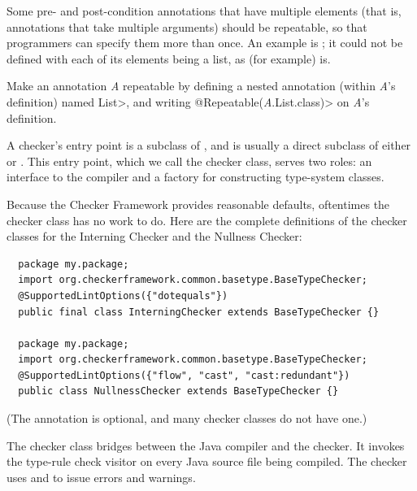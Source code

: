 
Some pre- and post-condition annotations that have multiple elements (that
is, annotations that take multiple arguments) should be repeatable, so that
programmers can specify them more than once.  An example is
; it could not be
defined with each of its elements being a list, as (for example)
 is.

Make an annotation \emph{A} repeatable by defining a nested annotation (within
\emph{A}'s definition) named \<List>, and writing
\<@Repeatable(\emph{A}.List.class)> on \emph{A}'s definition.



A checker's entry point is a subclass of
, and is usually a direct subclass
of either  or
.
This entry
point, which we call the checker class, serves two
roles:  an interface to the compiler and a factory for constructing
type-system classes.

Because the Checker Framework provides reasonable defaults, oftentimes the
checker class has no work to do.  Here are the complete definitions of the
checker classes for the Interning Checker and the Nullness Checker:

\begin{Verbatim}
  package my.package;
  import org.checkerframework.common.basetype.BaseTypeChecker;
  @SupportedLintOptions({"dotequals"})
  public final class InterningChecker extends BaseTypeChecker {}

  package my.package;
  import org.checkerframework.common.basetype.BaseTypeChecker;
  @SupportedLintOptions({"flow", "cast", "cast:redundant"})
  public class NullnessChecker extends BaseTypeChecker {}
\end{Verbatim}

(The  annotation is
optional, and many checker classes do not have one.)

The checker class bridges between the Java compiler and the checker.  It
invokes the type-rule check visitor on every Java source file being
compiled.  The checker uses
and
to issue errors and warnings.

